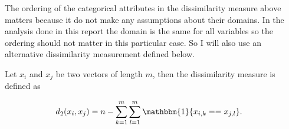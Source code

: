 \documentclass[result.tex]{subfiles}
\begin{document}
The ordering of the categorical attributes in the dissimilarity measure above matters because it do not make any assumptions about their domains. In the analysis done in this report the domain is the same for all variables so the ordering should not matter in this particular case. So I will also use an alternative dissimilarity measurement defined below.

Let $x_i$ and $x_j$ be two vectors of length $m$, then the dissimilarity measure is defined as

\begin{align*}
d_2(x_i, x_j) &= n - \sum_{k=1}^{m} \sum_{l=1}^{m} \mathbbm{1} \{ x_{i, k} == x_{j, l} \}.
\end{align*}
\end{document}
